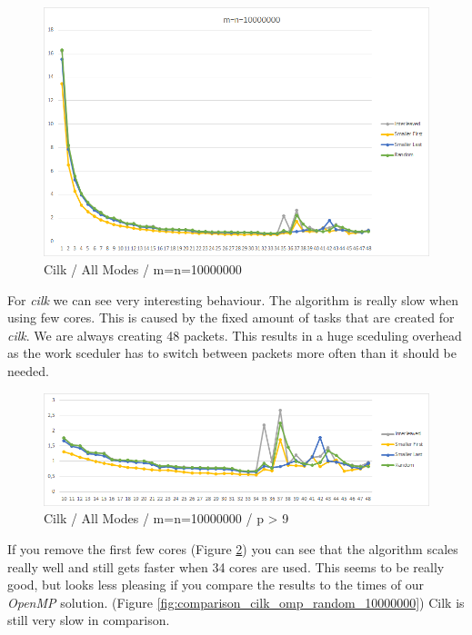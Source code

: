 \documentclass[12pt,a4paper,titlepage,oneside]{scrartcl}
\begin{document}
\begin{figure}[h]
\includegraphics[width=\linewidth]{Saturn_Cilk_10000000}
\caption{Cilk / All Modes / m=n=10000000}
\label{fig:cilk_allm_10000000}
\end{figure}

For \textit{cilk} we can see very interesting behaviour. The algorithm is really slow when using few cores. This is caused by the fixed amount of tasks that are created for \textit{cilk}. We are always creating 48 packets. This results in a huge sceduling overhead as the work sceduler has to switch between packets more often than it should be needed.

\begin{figure}[h]
\includegraphics[width=\linewidth]{Saturn_Cilk_10000000_Cut}
\caption{Cilk / All Modes / m=n=10000000 / p > 9}
\label{fig:cilk_allm_10000000_cut}
\end{figure}

If you remove the first few cores (Figure \ref{fig:cilk_allm_10000000_cut}) you can see that the algorithm scales really well and still gets faster when 34 cores are used.
This seems to be really good, but looks less pleasing if you compare the results to the times of our \textit{OpenMP} solution. (Figure \ref{fig:comparison_cilk_omp_random_10000000}) Cilk is still very slow in comparison.
\end{document}
